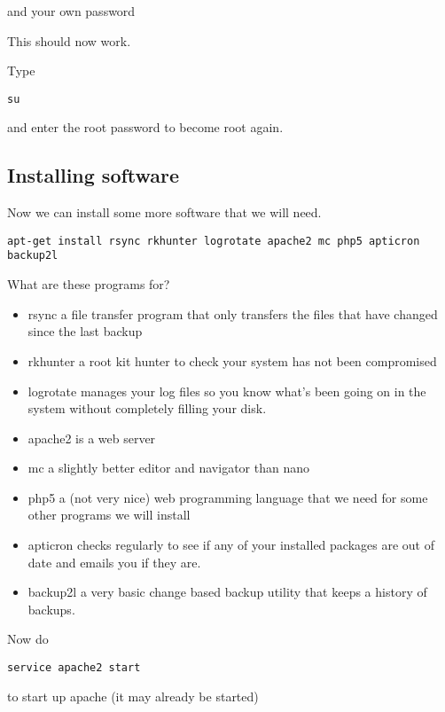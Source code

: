 \documentclass[12pt, a4paper]{article}
\begin{document}
and your own password

This should now work.

Type 

\begin{verbatim}
su
\end{verbatim}

and enter the root password to become root again.

\subsection*{Installing software}
Now we can install some more software that we will need.
\begin{verbatim}
apt-get install rsync rkhunter logrotate apache2 mc php5 apticron backup2l
\end{verbatim}

What are these programs for?
\begin{itemize}
 \item{rsync} a file transfer program that only transfers the files that have changed  since the last backup
 \item rkhunter a root kit hunter to check your system has not been compromised

 \item logrotate manages your log files so you know what’s been going on in the system without completely filling your disk.
 \item apache2 is a web server   
 \item mc a slightly better editor and navigator than nano
 \item php5 a (not very nice) web programming language that we need for some other programs we will install
 \item apticron checks regularly to see if any of your installed packages are out of date and emails you if they are.

 \item backup2l a very basic change based backup utility that keeps a history of backups.
 


\end{itemize}



Now do 

\begin{verbatim}
service apache2 start
\end{verbatim}

to start up apache (it may already be started)
\end{document}
